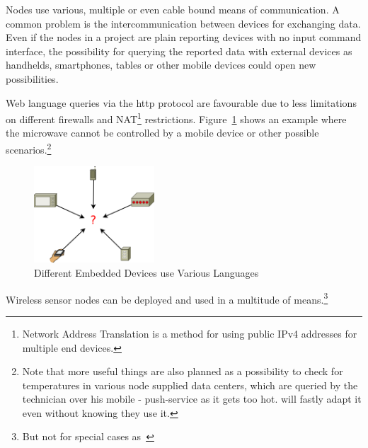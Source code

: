 Nodes use various, multiple or even cable bound means of communication. A common problem is the intercommunication between devices for 
exchanging data. Even if the nodes in a project are plain reporting devices with no input command interface, the possibility for
querying the reported data with external devices as handhelds, smartphones, tables or other mobile devices could open new possibilities.

Web language queries via the http protocol are favourable due to less limitations on different firewalls and NAT\footnote{Network Address Translation is a
method for using public IPv4 addresses for multiple end devices.} restrictions. Figure~\ref{fig:problem} shows an example where the microwave cannot
be controlled by a mobile device or other possible scenarios.\footnote{Note that more useful things are also planned as a possibility to check for 
temperatures in various node supplied data centers, which are queried by the technician over his mobile - push-service as it gets too hot.
 will fastly adapt it even without knowing they use it.}

\begin{figure}[h]
   \centering
   \includegraphics[width=0.4\textwidth]{pic/problem.png}%
   \caption{Different Embedded Devices use Various Languages}
   \label{fig:problem}%
\end{figure}


Wireless sensor nodes can be deployed and used in a multitude of means.\footnote{But not for special cases as~\cite{biederbeck}}
